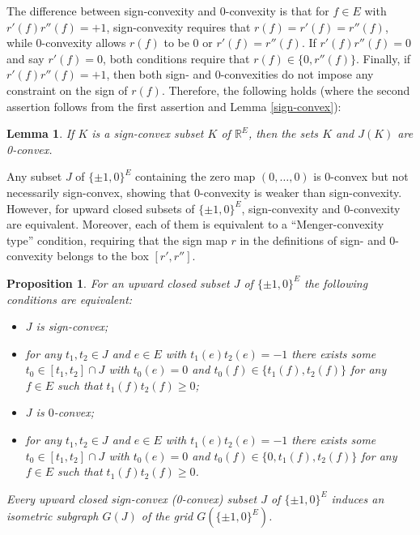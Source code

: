 \documentclass[11pt,a4paper]{amsart}
\newtheorem{proposition}{Proposition}
\newtheorem{lemma}{Lemma}
\theoremstyle{definition}
\numberwithin{equation}{section}
\newcommand{\hcovectors}{J}
\begin{document}
The difference between sign-convexity and 0-convexity is that for $f\in E$ with $r'(f)r''(f)=+1$,  sign-convexity requires that $r(f)=r'(f)=r''(f)$, while 0-convexity allows $r(f)$ to be $0$ or $r'(f)=r''(f)$. If $r'(f)r''(f)=0$ and say $r'(f)=0$, both conditions require that $r(f)\in \{ 0,r''(f)\}$. Finally, if  $r'(f)r''(f)=+1$, then both sign- and 0-convexities  do not impose any constraint on the sign of $r(f)$. Therefore, the following holds (where the second assertion follows from  the first assertion and Lemma \ref{sign-convex}):

\begin{lemma}\label{sign-convexity->SCA} If $K$ is a sign-convex  subset $K$ of  ${\mathbb R}^E$, then the sets $K$ and   $\hcovectors(K)$ are 0-convex.
\end{lemma}

Any subset $\hcovectors$ of $\{ \pm 1,0\}^E$ containing the zero map $(0,\ldots,0)$ is $0$-convex but not necessarily sign-convex, showing that $0$-convexity is weaker than sign-convexity. However, for upward closed subsets of  $\{ \pm 1,0\}^E$, sign-convexity and 0-convexity are equivalent.  Moreover, each of them is equivalent to a ``Menger-convexity type'' condition, requiring that the sign map $r$ in the definitions of sign- and 0-convexity belongs to the box $[r',r'']$.



\begin{proposition} \label{sign-convex-upper-closed} For an upward closed subset $\hcovectors$
of $\{ \pm 1,0\}^E$ the following conditions are equivalent:
\begin{itemize}
\item[\rm(i)] $\hcovectors$ is sign-convex;
\item[\rm(i$'$)] for any $t_1,t_2\in \hcovectors$ and $e\in E$ with $t_1(e)t_2(e)=-1$ there exists some $t_0\in [t_1,t_2]\cap \hcovectors$ with $t_0(e)=0$ and $t_0(f)\in \{ t_1(f),t_2(f)\}$ for any $f\in E$ such that $t_1(f)t_2(f)\ge 0$;
\item[\rm(ii)] $\hcovectors$ is $0$-convex;
\item[\rm(ii$'$)] for any $t_1,t_2\in \hcovectors$ and $e\in E$ with $t_1(e)t_2(e)=-1$ there exists some $t_0\in [t_1,t_2]\cap \hcovectors$ with $t_0(e)=0$ and $t_0(f)\in \{ 0, t_1(f),t_2(f)\}$ for any $f\in E$ such that $t_1(f)t_2(f)\ge 0$.
\end{itemize}
Every upward closed sign-convex (0-convex) subset $\hcovectors$ of $\{ \pm 1,0\}^E$ induces an isometric
subgraph $G(\hcovectors)$ of the grid $G(\{ \pm 1, 0\}^E)$.
\end{proposition}
\end{document}
